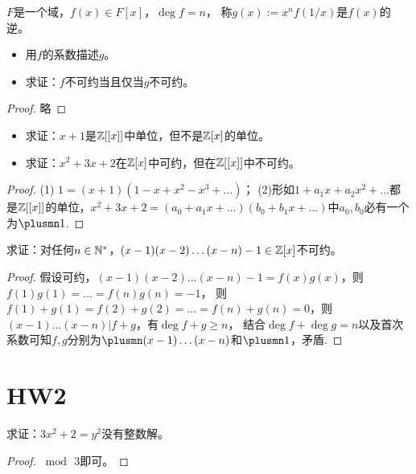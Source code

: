 \begin{exercise}
    $F$是一个域，$f(x)\in F[x]$，$\deg f=n$，
    称$g(x):=x^nf(1/x)$是$f(x)$的逆。
    \begin{itemize}
        \item[(1)]用$f$的系数描述$g$。
        \item[(2)]求证：$f$不可约当且仅当$g$不可约。
    \end{itemize}
\end{exercise}
\begin{proof}
    略
\end{proof}

\begin{exercise}
    \begin{itemize}
        \item[(1)]求证：$x+1$是$\mathbb{Z}[[x]]$中单位，但不是$\mathbb{Z}[x]$的单位。
        \item[(2)]求证：$x^2+3x+2$在$\mathbb{Z}[x]$中可约，但在$\mathbb{Z}[[x]]$中不可约。
    \end{itemize}
\end{exercise}
\begin{proof}
    (1) $1=(x+1)(1-x+x^2-x^3+\ldots)$；
    (2)形如$1+a_1x+a_2x^2+\ldots$都是$\mathbb{Z}[[x]]$的单位，$x^2+3x+2=(a_0+a_1x+\ldots)(b_0+b_1x+\ldots)$中$a_0,b_0$必有一个为$\plusmn 1$.
\end{proof}

\begin{exercise}
    求证：对任何$n\in\mathbb{N}^*$，$(x-1)(x-2)\ldots(x-n)-1\in\mathbb{Z}[x]$不可约。
\end{exercise}
\begin{proof}
    假设可约，$(x-1)(x-2)\ldots(x-n)-1=f(x)g(x)$，则$f(1)g(1)=\ldots=f(n)g(n)=-1$，
    则$f(1)+g(1)=f(2)+g(2)=\ldots=f(n)+g(n)=0$，则$(x-1)\ldots(x-n)|f+g$，有$\deg f+g\geqslant n$，
    结合$\deg f+\deg g=n$以及首次系数可知$f,g$分别为$\plusmn(x-1)\ldots(x-n)$和$\plusmn 1$，矛盾.
\end{proof}

\section{HW2}
\begin{exercise}
    求证：$3x^2+2=y^2$没有整数解。
\end{exercise}
\begin{proof}
    $\bmod\,3$即可。
\end{proof}

